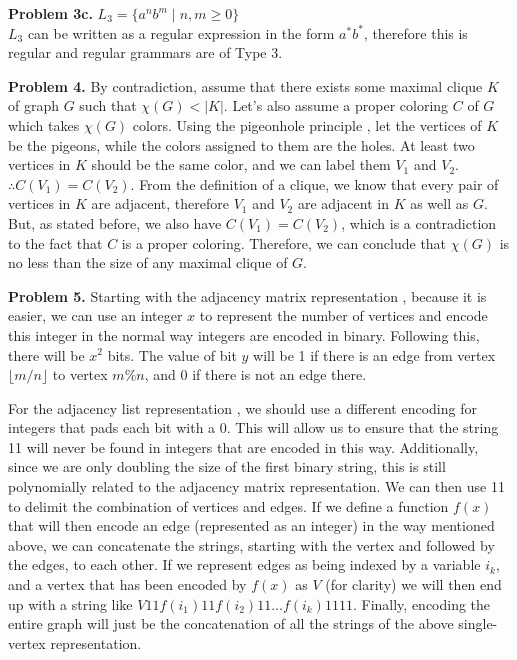 \documentclass{article}
\begin{document}
\hfill

\textbf{Problem 3c.} $L_3 = \{ a^nb^m \mid n,m \geq 0 \}$ \\
$L_3$ can be written as a regular expression in the form $a^*b^*$, therefore this is regular and regular grammars are of Type 3.

\hfill

\textbf{Problem 4.} By contradiction, assume that there exists some maximal clique $K$ of graph $G$ such that $\chi(G) < |K|$. Let's also assume a proper coloring \cite{website:4} $C$ of $G$ which takes $\chi(G)$ colors. Using the pigeonhole principle \cite{website:3}, let the vertices of $K$ be the pigeons, while the colors assigned to them are the holes. At least two vertices in $K$ should be the same color, and we can label them $V_1$ and $V_2$. $\therefore C(V_1) = C(V_2)$. From the definition of a clique, we know that every pair of vertices in $K$ are adjacent, therefore $V_1$ and $V_2$ are adjacent in $K$ as well as $G$. But, as stated before, we also have $C(V_1) = C(V_2)$, which is a contradiction to the fact that $C$ is a proper coloring. Therefore, we can conclude that $\chi(G)$ is no less than the size of any maximal clique of $G$.

\hfill

\textbf{Problem 5.} Starting with the adjacency matrix representation \cite{website:5}, because it is easier, we can use an integer $x$ to represent the number of vertices and encode this integer in the normal way integers are encoded in binary. Following this, there will be $x^2$ bits. The value of bit $y$ will be 1 if there is an edge from vertex $\lfloor m/n \rfloor$ to vertex $m\%n$, and 0 if there is not an edge there.

\hfill

For the adjacency list representation \cite{website:5}, we should use a different encoding for integers that pads each bit with a 0. This will allow us to ensure that the string 11 will never be found in integers that are encoded in this way. Additionally, since we are only doubling the size of the first binary string, this is still polynomially related to the adjacency matrix representation.  We can then use 11 to delimit the combination of vertices and edges. If we define a function $f(x)$ that will then encode an edge (represented as an integer) in the way mentioned above, we can concatenate the strings, starting with the vertex and followed by the edges, to each other. If we represent edges as being indexed by a variable $i_k$, and a vertex that has been encoded by $f(x)$ as $V$ (for clarity) we will then end up with a string like $V11f(i_1)11f(i_2)11...f(i_k)1111$. Finally, encoding the entire graph will just be the concatenation of all the strings of the above single-vertex representation.
\end{document}
